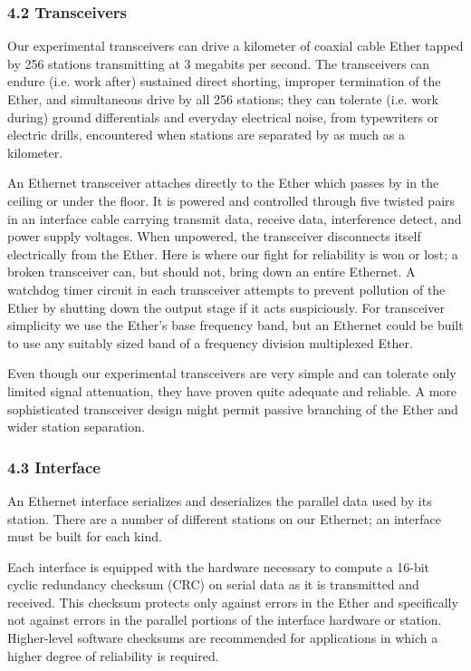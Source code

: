 \vspace{-6pt}
\subsubsection{4.2 Transceivers}

Our experimental transceivers can drive a kilometer of coaxial cable Ether tapped by 256 stations transmitting at 3 megabits per second. The transceivers can endure (i.e. work after) sustained direct shorting, improper termination of the Ether, and simultaneous drive by all 256 stations; they can tolerate (i.e. work during) ground differentials and everyday electrical noise, from typewriters or electric drills, encountered when stations are separated by as much as a kilometer.

An Ethernet transceiver attaches directly to the Ether which passes by in the ceiling or under the floor. It is powered and controlled through five twisted pairs in an interface cable carrying transmit data, receive data, interference detect, and power supply voltages. When unpowered, the transceiver disconnects itself electrically from the Ether. Here is where our fight for reliability is won or lost; a broken transceiver can, but should not, bring down an entire Ethernet. A watchdog timer circuit in each transceiver attempts to prevent pollution of the Ether by shutting down the output stage if it acts suspiciously. For transceiver simplicity we use the Ether's base frequency band, but an Ethernet could be built to use any suitably sized band of a frequency division multiplexed Ether.

Even though our experimental transceivers are very simple and can tolerate only limited signal attenuation, they have proven quite adequate and reliable. A more sophisticated transceiver design might permit passive branching of the Ether and wider station separation.

\vspace{-6pt}

\subsubsection{4.3 Interface}

An Ethernet interface serializes and deserializes the parallel data used by its station. There are a number of different stations on our Ethernet; an interface must be built for each kind.

Each interface is equipped with the hardware necessary to compute a 16-bit cyclic redundancy checksum (CRC) on serial data as it is transmitted and received. This checksum protects only against errors in the Ether and specifically not against errors in the parallel portions of the interface hardware or station. Higher-level software checksums are recommended for applications in which a higher degree of reliability is required.

